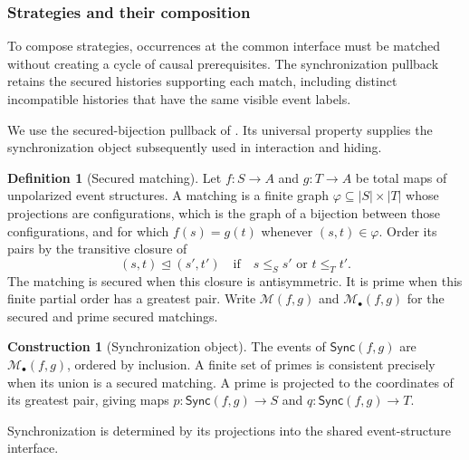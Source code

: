\documentclass[11pt,a4paper]{article}
\numberwithin{equation}{section}
\theoremstyle{definition}
\newtheorem{definition}[theorem]{Definition}
\newtheorem{construction}[construction]{Construction}
\theoremstyle{remark}
\theoremstyle{plain}
\begin{document}
\subsubsection{Strategies and their composition}

To compose strategies, occurrences at the common interface must be
matched without creating a cycle of causal prerequisites. The
synchronization pullback retains the secured histories supporting each
match, including distinct incompatible histories that have the same
visible event labels.

We use the secured-bijection pullback of \citet{CastellanEtAl2017}.
Its universal property supplies the synchronization object subsequently
used in interaction and hiding.

\begin{definition}[Secured matching]
\label{def:egt-secured-matching}
Let $f:S\to A$ and $g:T\to A$ be total maps of unpolarized event
structures. A matching is a finite graph $\varphi\subseteq |S|\times|T|$
whose projections are configurations, which is the graph of a bijection
between those configurations, and for which $f(s)=g(t)$ whenever
$(s,t)\in\varphi$. Order its pairs by the transitive closure of
\[
 (s,t)\mathrel{\trianglelefteq}(s',t')
 \quad\text{if}\quad s\leq_S s'\text{ or }t\leq_T t'.
\]
The matching is secured when this closure is antisymmetric. It is prime
when this finite partial order has a greatest pair. Write
$\mathcal M(f,g)$ and $\mathcal M_\bullet(f,g)$ for the secured and
prime secured matchings.
\end{definition}

\begin{construction}[Synchronization object]
\label{con:egt-pullback}
The events of $\mathsf{Sync}(f,g)$ are $\mathcal M_\bullet(f,g)$, ordered by
inclusion. A finite set of primes is consistent precisely when its
union is a secured matching. A prime is projected to the coordinates
of its greatest pair, giving maps $p:\mathsf{Sync}(f,g)\to S$ and $q:\mathsf{Sync}(f,g)\to T$.
\end{construction}

\noindent Synchronization is determined by its projections into the shared event-structure interface.
\begin{center}
\end{center}
\end{document}
